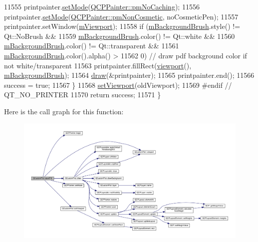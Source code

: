 \begin{DoxyCode}
11555     printpainter.\hyperlink{class_q_c_p_painter_af6b1f7d2bbc548b10aa55d8b6ad49577}{setMode}(\hyperlink{class_q_c_p_painter_a156cf16444ff5e0d81a73c615fdb156dae78f9a4eb277a5f9207f50850a51a0b0}{QCPPainter::pmNoCaching});
11556     printpainter.\hyperlink{class_q_c_p_painter_af6b1f7d2bbc548b10aa55d8b6ad49577}{setMode}(\hyperlink{class_q_c_p_painter_a156cf16444ff5e0d81a73c615fdb156dac1e481bfaf408f2bd2eaad3ec341f36b}{QCPPainter::pmNonCosmetic}, noCosmeticPen);
11557     printpainter.setWindow(\hyperlink{class_q_custom_plot_ac0a7c38a715526c257cff95774f83ab6}{mViewport});
11558     \textcolor{keywordflow}{if} (\hyperlink{class_q_custom_plot_a3aef5de4ac012178e3293248e9c63737}{mBackgroundBrush}.style() != Qt::NoBrush &&
11559         \hyperlink{class_q_custom_plot_a3aef5de4ac012178e3293248e9c63737}{mBackgroundBrush}.color() != Qt::white &&
11560         \hyperlink{class_q_custom_plot_a3aef5de4ac012178e3293248e9c63737}{mBackgroundBrush}.color() != Qt::transparent &&
11561         \hyperlink{class_q_custom_plot_a3aef5de4ac012178e3293248e9c63737}{mBackgroundBrush}.color().alpha() >
11562             0) \textcolor{comment}{// draw pdf background color if not white/transparent}
11563       printpainter.fillRect(\hyperlink{class_q_custom_plot_a953ecdbc28018e7e84cb6213ad3d88c2}{viewport}(), \hyperlink{class_q_custom_plot_a3aef5de4ac012178e3293248e9c63737}{mBackgroundBrush});
11564     \hyperlink{class_q_custom_plot_ad7a7d878bf050f101a43008e7d8fdb52}{draw}(&printpainter);
11565     printpainter.end();
11566     success = \textcolor{keyword}{true};
11567   \}
11568   \hyperlink{class_q_custom_plot_a3f9bc4b939dd8aaba9339fd09f273fc4}{setViewport}(oldViewport);
11569 \textcolor{preprocessor}{#endif // QT\_NO\_PRINTER}
11570   \textcolor{keywordflow}{return} success;
11571 \}
\end{DoxyCode}


Here is the call graph for this function\+:\nopagebreak
\begin{figure}[H]
\begin{center}
\leavevmode
\includegraphics[width=350pt]{class_q_custom_plot_a632da44c6d94ea8b271eb483b08b5114_cgraph}
\end{center}
\end{figure}


